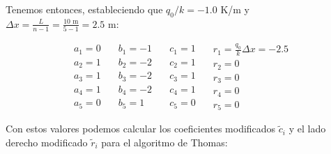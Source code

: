\documentclass[11pt,a4paper]{article}
\begin{document}
Tenemos entonces, estableciendo que $q_0/k = -1\textrm{.}0$ K/m y 
$\Delta x = \frac{L}{n - 1} = \frac{10 \text{ m}}{5 - 1} = 2\textrm{.}5 \text{ m}$:

\begin{equation}
  \begin{array}{l}
    a_1 = 0 \\
    a_2 = 1 \\
    a_3 = 1 \\
    a_4 = 1 \\
    a_5 = 0
  \end{array} \quad
  \begin{array}{l}
    b_1 = -1 \\
    b_2 = -2 \\
    b_3 = -2 \\
    b_4 = -2 \\
    b_5 = 1
  \end{array} \quad
  \begin{array}{l}
    c_1 = 1 \\
    c_2 = 1 \\
    c_3 = 1 \\
    c_4 = 1 \\
    c_5 = 0
  \end{array} \quad 
  \begin{array}{l}
    r_1 = \frac{q_0}{k} \Delta x = -2\textrm{.}5\\
    r_2 = 0 \\
    r_3 = 0 \\
    r_4 = 0 \\
    r_5 = 0
  \end{array}
\end{equation}

Con estos valores podemos calcular los coeficientes modificados $\tilde{c}_i$ y 
el lado derecho modificado $\tilde{r}_i$ para el algoritmo de Thomas:
\end{document}
